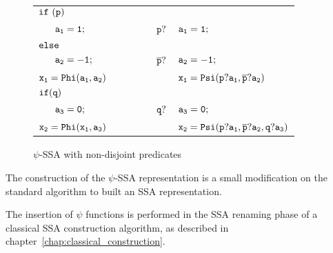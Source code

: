
\begin{figure}
\begin{center}
\footnotesize
\begin{tabular}{llll}
${\tt if\ (p)}$        & & & \\
${\tt\ \ \ \ \ a_1 = 1;}$ & \ \ \ \ \  & ${\tt p?}$ & ${\tt a_1 = 1;}$ \\
${\tt else}$          & & & \\
${\tt\ \ \ \ \     a_2 = -1;}$ & \ \ \ \ \  & ${\tt \overline{p}?}$ & ${\tt a_2 = -1;}$ \\
${\tt x_1 = Phi(a_1, a_2)}$ & & & ${\tt x_1 = Psi(p?a_1, \overline{p}?a_2)}$ \\
${\tt if (q)}$        & & & \\
${\tt\ \ \ \ \ a_3 = 0;}$ & \ \ \ \ \  & ${\tt q?}$ & ${\tt a_3 = 0;}$ \\
${\tt x_2 = Phi(x_1, a_3)}$ & & & ${\tt x_2 = Psi(p?a_1, \overline{p}?a_2, q?a_3)}$ \\
\end{tabular}
\caption{$\psi$-SSA with non-disjoint predicates}
\label{fig:non_disjoint_pred}
\end{center}
\end{figure}



The construction of the $\psi$-SSA representation is a small
modification on the standard algorithm to built an SSA representation.

The insertion of $\psi$ functions is performed in the SSA renaming
phase of a classical SSA construction algorithm, as described in
chapter~\ref{chap:classical_construction}.

